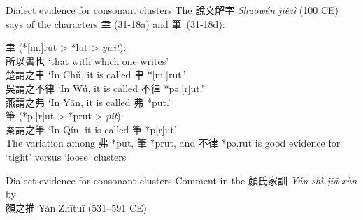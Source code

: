 {Dialect evidence for consonant clusters}
The
說文解字 \emph{Shuōwén jiězì} (100 CE) says of the characters 聿
(31-18a) and 筆~(31-18d):

  

\hspace{5mm} 聿 (*[m.]rut > *lut > 
 \emph{ywit}):\\
\hspace{5mm} 所以書也 \hspace{6mm} `that with which one writes'\\
\hspace{5mm} 楚謂之聿 \hspace{6mm} `In Chǔ, it is called 聿 *[m.]rut.'\\
\hspace{5mm} 吳謂之不律 \hspace{3mm} `In Wú, it is called 不律 *pə.{[}r]ut.'\\
\hspace{5mm} 燕謂之弗 \hspace{6mm} `In Yān, it is called 弗 *put.'\\
\hspace{5mm} 筆 (*p.{[}r]ut > *prut > 
 \emph{pit}): \\
\hspace{5mm} 秦謂之筆 \hspace{6mm} `In Qín, it is called 筆 *p{[}r]ut' \\ %

  

The variation among 弗 *put, 筆 *prut, and 不律 *pə.rut is good evidence
for `tight' versus `loose' clusters



{Dialect evidence for consonant clusters}
Comment in the 顏氏家訓  \emph{Yán shì jiā xùn} by \\ 顏之推 Yán Zhītuī (531--591 CE)


